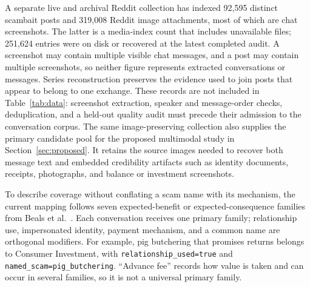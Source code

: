 \documentclass[letterpaper,11pt]{article}
\begin{document}
A separate live and archival Reddit collection has indexed 92,595 distinct
scambait posts and 319,008 Reddit image attachments, most of which are chat
screenshots. The latter is a media-index count that includes unavailable files;
251,624 entries were on disk or recovered at the latest completed audit. A
screenshot may contain multiple visible chat messages, and a post may contain
multiple screenshots, so neither figure represents extracted conversations or
messages. Series reconstruction preserves the
evidence used to join posts that appear to belong to one exchange. These records
are not included in Table~\ref{tab:data}: screenshot extraction, speaker and
message-order checks, deduplication, and a held-out quality audit must precede
their admission to the conversation corpus. The same image-preserving collection
also supplies the primary candidate pool for the proposed multimodal study in
Section~\ref{sec:proposed}. It retains the source images needed to recover both
message text and embedded credibility artifacts such as identity documents,
receipts, photographs, and balance or investment screenshots.

To describe coverage without conflating a scam name with its mechanism, the
current mapping follows seven expected-benefit or expected-consequence families
from Beals et al.~\cite{beals2015fraud}. Each conversation receives one primary
family; relationship use, impersonated identity, payment mechanism, and a common
name are orthogonal modifiers. For example, pig butchering that promises returns
belongs to Consumer Investment, with \texttt{relationship\_used=true} and
\texttt{named\_scam=pig\_butchering}. ``Advance fee'' records how value is taken
and can occur in several families, so it is not a universal primary family.
\end{document}

